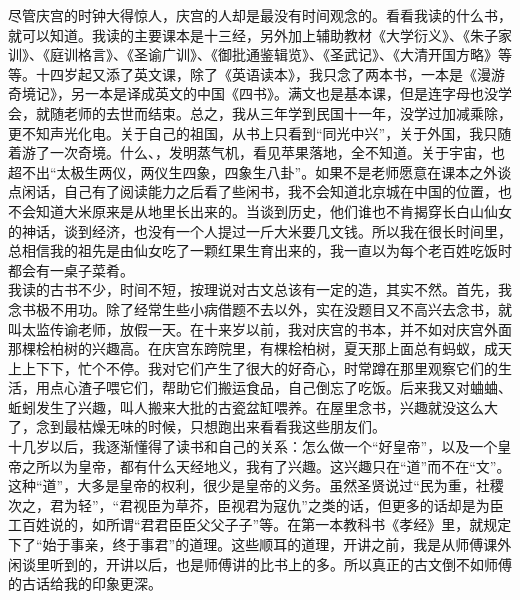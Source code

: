 尽管庆宫的时钟大得惊人，庆宫的人却是最没有时间观念的。看看我读的什么书，就可以知道。我读的主要课本是十三经，另外加上辅助教材《大学衍义》、《朱子家训》、《庭训格言》、《圣谕广训》、《御批通鉴辑览》、《圣武记》、《大清开国方略》等等。十四岁起又添了英文课，除了《英语读本》，我只念了两本书，一本是《漫游奇境记》，另一本是译成英文的中国《四书》。满文也是基本课，但是连字母也没学会，就随老师的去世而结束。总之，我从三年学到民国十一年，没学过加减乘除，更不知声光化电。关于自己的祖国，从书上只看到“同光中兴”，关于外国，我只随着游了一次奇境。什么、，发明蒸气机，看见苹果落地，全不知道。关于宇宙，也超不出“太极生两仪，两仪生四象，四象生八卦”。如果不是老师愿意在课本之外谈点闲话，自己有了阅读能力之后看了些闲书，我不会知道北京城在中国的位置，也不会知道大米原来是从地里长出来的。当谈到历史，他们谁也不肯揭穿长白山仙女的神话，谈到经济，也没有一个人提过一斤大米要几文钱。所以我在很长时间里，总相信我的祖先是由仙女吃了一颗红果生育出来的，我一直以为每个老百姓吃饭时都会有一桌子菜肴。\\

我读的古书不少，时间不短，按理说对古文总该有一定的造，其实不然。首先，我念书极不用功。除了经常生些小病借题不去以外，实在没题目又不高兴去念书，就叫太监传谕老师，放假一天。在十来岁以前，我对庆宫的书本，并不如对庆宫外面那棵桧柏树的兴趣高。在庆宫东跨院里，有棵桧柏树，夏天那上面总有蚂蚁，成天上上下下，忙个不停。我对它们产生了很大的好奇心，时常蹲在那里观察它们的生活，用点心渣子喂它们，帮助它们搬运食品，自己倒忘了吃饭。后来我又对蛐蛐、蚯蚓发生了兴趣，叫人搬来大批的古瓷盆缸喂养。在屋里念书，兴趣就没这么大了，念到最枯燥无味的时候，只想跑出来看看我这些朋友们。\\

十几岁以后，我逐渐懂得了读书和自己的关系：怎么做一个“好皇帝”，以及一个皇帝之所以为皇帝，都有什么天经地义，我有了兴趣。这兴趣只在“道”而不在“文”。这种“道”，大多是皇帝的权利，很少是皇帝的义务。虽然圣贤说过“民为重，社稷次之，君为轻”，“君视臣为草芥，臣视君为寇仇”之类的话，但更多的话却是为臣工百姓说的，如所谓“君君臣臣父父子子”等。在第一本教科书《孝经》里，就规定下了“始于事亲，终于事君”的道理。这些顺耳的道理，开讲之前，我是从师傅课外闲谈里听到的，开讲以后，也是师傅讲的比书上的多。所以真正的古文倒不如师傅的古话给我的印象更深。\\

